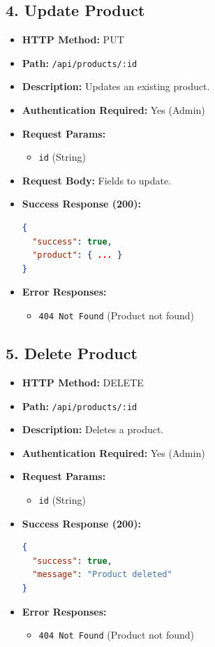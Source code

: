 \documentclass[12pt,a4paper]{article}
\begin{document}
\subsection{4. Update Product}
\begin{itemize}
    \item \textbf{HTTP Method:} PUT
    \item \textbf{Path:} \texttt{/api/products/:id}
    \item \textbf{Description:} Updates an existing product.
    \item \textbf{Authentication Required:} Yes (Admin)
    \item \textbf{Request Params:}
    \begin{itemize}
        \item \texttt{id} (String)
    \end{itemize}
    \item \textbf{Request Body:} Fields to update.
    \item \textbf{Success Response (200):}
\begin{lstlisting}[language=json]
{
  "success": true,
  "product": { ... }
}
\end{lstlisting}
    \item \textbf{Error Responses:}
    \begin{itemize}
        \item \texttt{404 Not Found} (Product not found)
    \end{itemize}
\end{itemize}

\subsection{5. Delete Product}
\begin{itemize}
    \item \textbf{HTTP Method:} DELETE
    \item \textbf{Path:} \texttt{/api/products/:id}
    \item \textbf{Description:} Deletes a product.
    \item \textbf{Authentication Required:} Yes (Admin)
    \item \textbf{Request Params:}
    \begin{itemize}
        \item \texttt{id} (String)
    \end{itemize}
    \item \textbf{Success Response (200):}
\begin{lstlisting}[language=json]
{
  "success": true,
  "message": "Product deleted"
}
\end{lstlisting}
    \item \textbf{Error Responses:}
    \begin{itemize}
        \item \texttt{404 Not Found} (Product not found)
    \end{itemize}
\end{itemize}
\end{document}
